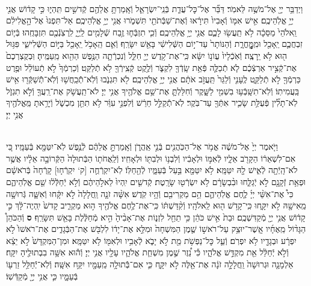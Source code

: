 \documentclass[twoside, openany, parskip=half, 11pt]{book}
\begin{document}
\begin{sometimes}
\begin{footnotesize}
\begin{multicols}{2}
\\
וַיְדַבֵּ֥ר יְיָ֖ אֶל־מֹשֶׁ֥ה לֵּאמֹֽר׃ דַּבֵּ֞ר אֶל־כׇּל־עֲדַ֧ת בְּֿנֵֽי־יִשְׂרָאֵ֛ל וְֿאָֽמַרְתָּ֥ אֲלֵהֶ֖ם קְֿדשִׁ֣ים תִּֽהְי֑וּ כִּ֣י קָד֔וֹשׁ אֲנִ֖י יְיָ֥ אֱלֹֽהֵיכֶֽם׃ אִ֣ישׁ אִמּ֤וֹ וְֿאָבִיו֙ תִּירָ֔אוּ וְֿאֶת־שַׁבְּֿתֹתַ֖י תִּשְׁמֹ֑רוּ אֲנִ֖י יְיָ֥ אֱלֹֽהֵיכֶֽם׃ אַל־תִּפְנוּ֙ אֶל־הָ֣אֱלִילִ֔ם וֵֽאלֹהֵי֙ מַסֵּכָ֔ה לֹ֥א תַֽעֲשׂ֖וּ לָכֶ֑ם אֲנִ֖י יְיָ֥ אֱלֹֽהֵיכֶֽם׃  וְֿכִ֧י תִזְבְּֿח֛וּ זֶ֥בַח שְֿׁלָמִ֖ים לַֽיְיָ֑ לִֽרְצֹֽנְֿכֶ֖ם תִּזְבָּחֻֽהוּ׃ בְּֿי֧וֹם זִבְחֲכֶ֛ם יֵֽאָכֵ֖ל וּמִֽמׇׇׇׇׇׇׇׇׇׇׇׇָּֽחֳרָ֑ת וְֿהַנּוֹתָר֙ עַד־י֣וֹם הַשְּֿׁלִישִׁ֔י בָּאֵ֖שׁ יִשָּׂרֵֽף׃ וְֿאִ֛ם הֵֽאָכֹ֥ל יֵֽאָכֵ֖ל בַּיּ֣וֹם הַשְּֿׁלִישִׁ֑י פִּגּ֥וּל ה֖וּא לֹ֥א יֵֽרָצֶֽה׃ וְֿאֹֽכְֿלָיו֙ עֲוֹנ֣וֹ יִשָּׂ֔א כִּֽי־אֶת־קֹ֥דֶשׁ יְיָ֖ חִלֵּ֑ל וְֿנִכְרְֿתָ֛ה הַנֶּ֥פֶשׁ הַהִ֖וא מֵֽעַמֶּֽיהָ׃ וּֽבְקֻצְרְכֶם֙ אֶת־קְֿצִ֣יר אַרְצְֿכֶ֔ם לֹ֧א תְֿכַלֶּ֛ה פְּֿאַ֥ת שָֽׂדְֿךָ֖ לִקְצֹ֑ר וְֿלֶ֥קֶט קְֿצִֽירְֿךָ֖ לֹ֥א תְֿלַקֵּֽט׃ וְֿכַרְמְֿךָ֙ לֹ֣א תְֿעוֹלֵ֔ל וּפֶ֥רֶט כַּרְמְֿךָ֖ לֹ֣א תְֿלַקֵּ֑ט לֶֽעָנִ֤י וְֿלַגֵּר֙ תַּֽעֲזֹ֣ב אֹתָ֔ם אֲנִ֖י יְיָ֥ אֱלֹֽהֵיכֶֽם׃  לֹ֖א תִּגְנֹ֑בוּ וְֿלֹֽא־תְֿֿכַֽחֲשׁ֥וּ וְֿלֹֽא־תְֿֿשַׁקְּֿר֖וּ אִ֥ישׁ בַּֽעֲמִיתֽוֹ׃ וְֿלֹֽא־תִשָּֽׁבְֿע֥וּ בִשְׁמִ֖י לַשָּׁ֑קֶר וְֿחִלַּלְתָּ֛ אֶת־שֵׁ֥ם אֱלֹהֶ֖יךָ אֲנִ֥י יְיָ׃ לֹא־תַֽעֲשֹׁ֥ק אֶת־רֵֽעֲךָ֖ וְֿלֹ֣א תִגְזֹ֑ל לֹֽא־תָלִ֞ין פְּֿעֻלַּ֥ת שָׂכִ֛יר אִתְּֿךָ֖ עַד־בֹּֽקֶר׃ לֹֽא־תְֿֿקַלֵּ֣ל חֵרֵ֔שׁ וְֿלִפְנֵ֣י עִוֵּ֔ר לֹ֥א תִתֵּ֖ן מִכְשֹׁ֑ל וְֿיָרֵ֥אתָ מֵּֽאֱלֹהֶ֖יךָ אֲנִ֥י יְיָ׃

\\
וַיֹּ֤אמֶר יְיָ֙ אֶל־מֹשֶׁ֔ה אֱמֹ֥ר אֶל־הַכֹּֽהֲנִ֖ים בְּֿנֵ֣י אַֽהֲרֹ֑ן וְֿאָֽמַרְתָּ֣ אֲלֵהֶ֔ם לְֿנֶ֥פֶשׁ לֹֽא־יִטַּמָּ֖א בְּֿעַמָּֽיו׃ כִּ֚י אִם־לִשְׁאֵר֔וֹ הַקָּרֹ֖ב אֵלָ֑יו לְֿאִמּ֣וֹ וּלְאָבִ֔יו וְֿלִבְנ֥וֹ וּלְבִתּ֖וֹ וּלְאָחִֽיו׃ וְֿלַֽאֲחֹת֤וֹ הַבְּֿתוּלָה֙ הַקְּֿרוֹבָ֣ה אֵלָ֔יו אֲשֶׁ֥ר לֹא־הָֽיְֿתָ֖ה לְֿאִ֑ישׁ לָ֖הּ יִטַּמָּֽא׃ לֹ֥א יִטַּמָּ֖א בַּ֣עַל בְּֿעַמָּ֑יו לְֿהֵ֖חַלּֽוֹ׃ לֹֽא־יִקְרְֿחֻ֤ה [ק‘ יִקְרְֿח֤וּ] קָרְֿחָה֙ בְּֿרֹאשָׁ֔ם וּפְאַ֥ת זְֿקָנָ֖ם לֹ֣א יְֿגַלֵּ֑חוּ וּבִ֨בְשָׂרָ֔ם לֹ֥א יִשְׂרְֿט֖וּ שָׂרָֽטֶת׃ קְֿדשִׁ֤ים יִֽהְיוּ֙ לֵאלֹ֣הֵיהֶ֔ם וְֿלֹ֣א יְֿחַלְּֿל֔וּ שֵׁ֖ם אֱלֹֽהֵיהֶ֑ם כִּי֩ אֶת־אִשֵּׁ֨י יְיָ֜ לֶ֧חֶם אֱלֹֽהֵיהֶ֛ם הֵ֥ם מַקְרִיבִ֖ם וְֿהָ֥יוּ קֹֽדֶשׁ׃  אִשָּׁ֨ה זֹנָ֤ה וַֽחֲלָלָה֙ לֹ֣א יִקָּ֔חוּ וְֿאִשָּׁ֛ה גְּֿרוּשָׁ֥ה מֵֽאִישָׁ֖הּ לֹ֣א יִקָּ֑חוּ כִּֽי־קָדֹ֥שׁ ה֖וּא לֵֽאלֹהָֽיו׃ וְֿקִ֨דַּשְׁתּ֔וֹ כִּֽי־אֶת־לֶ֥חֶם אֱלֹהֶ֖יךָ ה֣וּא מַקְרִ֑יב קָדשׁ֙ יִֽהְיֶה־לָּ֔ךְ כִּ֣י קָד֔וֹשׁ אֲנִ֥י יְיָ֖ מְֿקַדִּשְׁכֶֽם׃ וּבַת֙ אִ֣ישׁ כֹּהֵ֔ן כִּ֥י תֵחֵ֖ל לִזְנ֑וֹת אֶת־אָבִ֨יהָ֙ הִ֣יא מְֿחַלֶּ֔לֶת בָּאֵ֖שׁ תִּשָּׂרֵֽף׃ \textbf{ס} וְֿהַכֹּהֵן֩ הַגָּד֨וֹל מֵֽאֶחָ֜יו אֲֽשֶׁר־יוּצַ֥ק עַל־רֹאשׁ֣וֹ שֶׁ֤מֶן הַמִּשְׁחָה֙ וּמִלֵּ֣א אֶת־יָד֔וֹ לִלְבֹּ֖שׁ אֶת־הַבְּֿגָדִ֑ים אֶת־רֹאשׁוֹ֙ לֹ֣א יִפְרָ֔ע וּבְגָדָ֖יו לֹ֥א יִפְרֹֽם׃ וְֿעַ֛ל כׇּל־נַפְשֹׁ֥ת מֵ֖ת לֹ֣א יָבֹ֑א לְֿאָבִ֥יו וּלְאִמּ֖וֹ לֹ֥א יִטַּמָּֽא׃ וּמִן־הַמִּקְדָּשׁ֙ לֹ֣א יֵצֵ֔א וְֿלֹ֣א יְֿחַלֵּ֔ל אֵ֖ת מִקְדַּ֣שׁ אֱלֹהָ֑יו כִּ֡י נֵ֠זֶר שֶׁ֣מֶן מִשְׁחַ֧ת אֱלֹהָ֛יו עָלָ֖יו אֲנִ֥י יְיָ׃  וְֿה֕וּא אִשָּׁ֥ה בִבְתוּלֶ֖יהָ יִקָּֽח׃ אַלְמָנָ֤ה וּגְרוּשָׁה֙ וַֽחֲלָלָ֣ה זֹנָ֔ה אֶת־אֵ֖לֶּה לֹ֣א יִקָּ֑ח כִּ֛י אִם־בְּֿֿתוּלָ֥ה מֵֽעַמָּ֖יו יִקַּ֥ח אִשָּֽׁה׃ וְֿלֹֽא־יְֿֿחַלֵּ֥ל זַרְע֖וֹ בְּֿעַמָּ֑יו כִּ֛י אֲנִ֥י יְיָ֖ מְֿקַדְּֿשֽׁוֹ׃


\end{multicols}
\end{footnotesize}
\end{sometimes}
\end{document}
